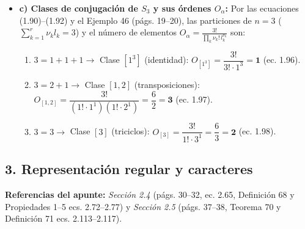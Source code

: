 \documentclass[11pt, a4paper]{article}
\begin{document}
\begin{itemize}
    \item \textbf{c) Clases de conjugación de $S_3$ y sus órdenes $O_\alpha$:}
    Por las ecuaciones (1.90)--(1.92) y el Ejemplo 46 (págs. 19--20), las particiones de $n = 3$ ($\sum_{k=1}^r \nu_k l_k = 3$) y el número de elementos $O_\alpha = \frac{3!}{\prod_k \nu_k! \, l_k^{\nu_k}}$ son:
    \begin{enumerate}
        \item $3 = 1 + 1 + 1 \to$ Clase $[1^3]$ (identidad): $O_{[1^3]} = \dfrac{3!}{3! \cdot 1^3} = \mathbf{1}$ (ec. 1.96).
        \item $3 = 2 + 1 \to$ Clase $[1, 2]$ (transposiciones): $O_{[1,2]} = \dfrac{3!}{(1! \cdot 1^1)(1! \cdot 2^1)} = \dfrac{6}{2} = \mathbf{3}$ (ec. 1.97).
        \item $3 = 3 \to$ Clase $[3]$ (triciclos): $O_{[3]} = \dfrac{3!}{1! \cdot 3^1} = \dfrac{6}{3} = \mathbf{2}$ (ec. 1.98).
    \end{enumerate}
\end{itemize}

\subsection*{3. Representación regular y caracteres}
\textbf{Referencias del apunte:} \textit{Sección 2.4} (págs. 30--32, ec. 2.65, Definición 68 y Propiedades 1--5 ecs. 2.72--2.77) y \textit{Sección 2.5} (págs. 37--38, Teorema 70 y Definición 71 ecs. 2.113--2.117).
\end{document}
